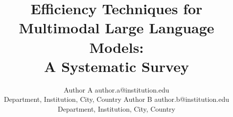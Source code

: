 \documentclass[jair,twoside,11pt,theapa]{article}
\begin{document}
\title{Efficiency Techniques for Multimodal Large Language Models:\\
       A Systematic Survey}

\author{%
  \name Author A \email author.a@institution.edu \\
  \addr Department, Institution, City, Country
  \AND
  \name Author B \email author.b@institution.edu \\
  \addr Department, Institution, City, Country
}


\maketitle

\begin{abstract}
\end{abstract}









\end{document}
